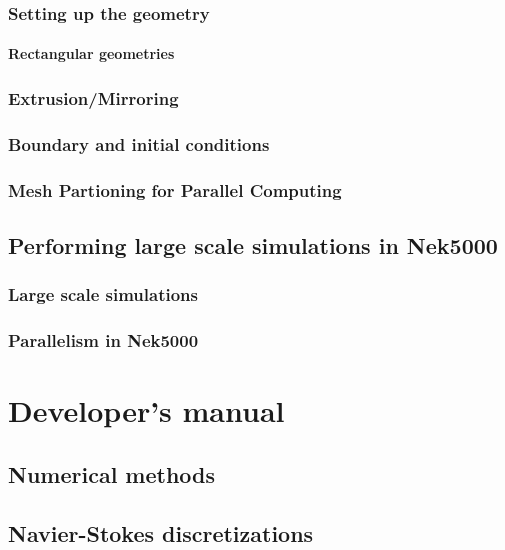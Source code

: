 \documentclass[11pt]{report}              %
\begin{document}
\section{Setting up the geometry}
\subsection{Rectangular geometries}
\label{sec:genbox}
%
\section{Extrusion/Mirroring}

\section{Boundary and initial conditions}



\section{Mesh Partioning for Parallel Computing}


\chapter{Performing large scale simulations  in Nek5000}
\section{Large scale simulations}

\section{Parallelism in Nek5000}

\part{Developer's manual}
\chapter{Numerical methods}



\chapter{Navier-Stokes discretizations}


%
%
\end{document}
